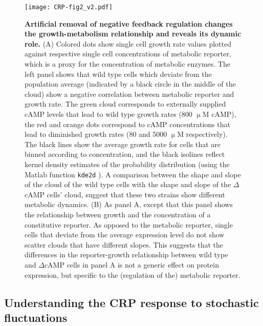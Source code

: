 \begin{figure}
	\centering
	\texttt{[image: CRP-fig2\_v2.pdf]}
	\caption{ 
		\textbf{Artificial removal of negative feedback regulation changes the growth-metabolism relationship and reveals its dynamic role.}		
		(A) Colored dots show single cell growth rate values plotted against respective single cell concentrations of metabolic reporter, which is a proxy for the concentration of metabolic enzymes. 
		The left panel shows that wild type cells which deviate from the population average (indicated by a black circle in the middle of the cloud) show a negative correlation between metabolic reporter and growth rate.
    	The green cloud corresponds to externally supplied cAMP levels that lead to wild type growth rates (800 $\upmu$M cAMP), the 
        red and orange dots correspond to cAMP concentrations that lead to diminished growth rates (80 and 5000 $\upmu$M respectively).
     	The black lines show the average growth rate for cells that are binned according to concentration, and the black isolines reflect kernel density estimates of the probability distribution (using the Matlab function \texttt{kde2d} \cite{Botev2010}).
        A comparison between the shape and slope of the cloud of the wild type cells with the 
        shape and slope of the  $\Delta$cAMP cells' cloud,
        suggest that these two strains show different metabolic dynamics.
		(B) As panel A, except that this panel shows the relationship between growth and the concentration of a constitutive reporter. 
		As opposed to the metabolic reporter, 
        single cells that deviate from the average expression level do not show scatter clouds that have different slopes.
		This suggests that the differences in the reporter-growth relationship between wild type and $\Delta$cAMP cells in panel A is not a generic effect on protein expression, 
        but specific to the (regulation of the) metabolic reporter.
	}
	\label{fig:CRP:fig2}
\end{figure}


\subsection{Understanding the CRP response to stochastic fluctuations}
\label{CRP:txt:CCsAndModel}

